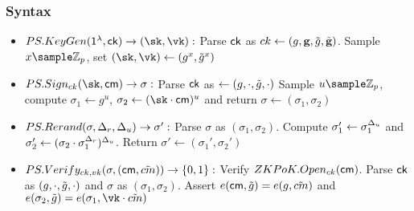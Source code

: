 \subsubsection{Syntax}
\begin{itemize}
    \item $PS.KeyGen(\secparam, \ck) \to (\sk, \vk):$ Parse $\mathsf{ck}$ as $ck \gets (g, \textbf{g}, \tilde{g}, \tilde{\textbf{g}})$. Sample $x \sample \Zp$, set $(\sk, \vk) \gets (g^x, \tilg^x)$

    \item $PS.Sign_{ck}(\sk, \cm) \to \sigma:$ Parse $\mathsf{ck}$ as $\gets (g, \cdot, \tilde{g}, \cdot)$ Sample $u \sample \Zp$, compute $\sigma_1 \gets g^u$, $\sigma_2 \gets (\sk \cdot \cm)^u$
     and return $\sigma \gets (\sigma_1, \sigma_2)$

     \item $PS.Rerand(\sigma, \Delta_r, \Delta_u) \to \sigma': $ Parse $\sigma$ as $(\sigma_1, \sigma_2)$. Compute $\sigma_1' \gets \sigma_1^{\Delta_u}$ and $\sigma_2' \gets (\sigma_2 \cdot \sigma_1^{\Delta_r})^{\Delta_u}$. Return $\sigma' \gets (\sigma_1', \sigma_2')$

     \item $PS.Verify_{ck, vk}(\sigma, (\mathsf{cm}, \tilde{cm})) \to \{0,1\}: $ Verify $ZKPoK.Open_{ck}(\mathsf{cm})$. Parse $\mathsf{ck}$ as $(g, \cdot, \tilde{g}, \cdot)$ and $\sigma$ as $(\sigma_1, \sigma_2)$. Assert $e(\mathsf{cm}, \tilde{g}) = e(g, \tilde{cm})$ and $e(\sigma_2, \tilg) = e(\sigma_1, \vk \cdot \tilcm)$
     
\end{itemize}
